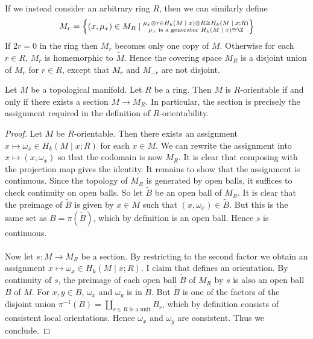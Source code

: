 \documentclass[a4paper]{article}
\begin{document}
If we instead consider an arbitrary ring $R$, then we can similarly define $$M_r=\left\{(x,\mu_x)\in M_R\;|\;\substack{\mu_x\otimes r\in H_k(M\;|\; x)\otimes R\cong H_k(M\;|\; x;R)\\\mu_x\text{ is a generator }H_k(M\;|\;x)\cong\Z}\right\}$$ If $2r=0$ in the ring then $M_r$ becomes only one copy of $M$. Otherwise for each $r\in R$, $M_r$ is homemorphic to $\widetilde{M}$. Hence the covering space $M_R$ is a disjoint union of $M_r$ for $r\in R$, except that $M_r$ and $M_{-r}$ are not disjoint. 

\begin{lmm}{}{} Let $M$ be a topological manifold. Let $R$ be a ring. Then $M$ is $R$-orientable if and only if there exists a section $M\to M_R$. In particular, the section is precisely the assignment required in the definition of $R$-orientability. \tcbline
\begin{proof}
Let $M$ be $R$-orientable. Then there exists an assignment $x\mapsto\omega_x\in H_k(M\;|\;x;R)$ for each $x\in M$. We can rewrite the assignment into $x\mapsto(x,\omega_x)$ so that the codomain is now $M_R$. It is clear that composing with the projection map gives the identity. It remains to show that the assignment is continuous. Since the topology of $M_R$ is generated by open balls, it suffices to check continuity on open balls. So let $\widetilde{B}$ be an open ball of $M_R$. It is clear that the preimage of $\widetilde{B}$ is given by $x\in M$ such that $(x,\omega_x)\in\widetilde{B}$. But this is the same set as $B=\pi(\widetilde{B})$, which by definition is an open ball. Hence $s$ is continuous. \\~\\

Now let $s:M\to M_R$ be a section. By restricting to the second factor we obtain an assignment $x\mapsto\omega_x\in H_k(M\;|\;x;R)$. I claim that defines an orientation. By continuity of $s$, the preimage of each open ball $\widetilde{B}$ of $M_R$ by $s$ is also an open ball $B$ of $M$. For $x,y\in B$, $\omega_x$ and $\omega_y$ is in $\widetilde{B}$. But $\widetilde{B}$ is one of the factors of the disjoint union $\pi^{-1}(B)=\coprod_{r\in R\text{ is a unit}}B_r$, which by definition consists of consistent local orientations. Hence $\omega_x$ and $\omega_y$ are consistent. Thus we conclude. 
\end{proof}
\end{lmm}
\end{document}
